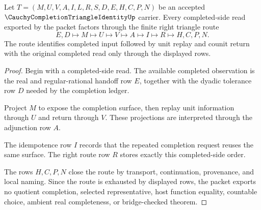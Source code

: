 \begin{theorem}
\label{thm:cauchy-completion-triangle-identity-right-route}
Let $T=(M,U,V,A,I,L,R,S,D,E,H,C,P,N)$ be an accepted $\CauchyCompletionTriangleIdentityUp$ carrier. Every completed-side read exported by the packet factors through the finite right triangle route
$$
E,D\longmapsto M\longmapsto U\longmapsto V\longmapsto A\longmapsto I\longmapsto R\longmapsto H,C,P,N .
$$
The route identifies completed input followed by unit replay and counit return with the original completed read only through the displayed rows.
\end{theorem}
\begin{proof}
Begin with a completed-side read. The available completed observation is the real and regular-rational handoff row $E$, together with the dyadic tolerance row $D$ needed by the completion ledger.

Project $M$ to expose the completion surface, then replay unit information through $U$ and return through $V$. These projections are interpreted through the adjunction row $A$.

The idempotence row $I$ records that the repeated completion request reuses the same surface. The right route row $R$ stores exactly this completed-side order.

The rows $H,C,P,N$ close the route by transport, continuation, provenance, and local naming. Since the route is exhausted by displayed rows, the packet exports no quotient completion, selected representative, host function equality, countable choice, ambient real completeness, or bridge-checked theorem.
\end{proof}

